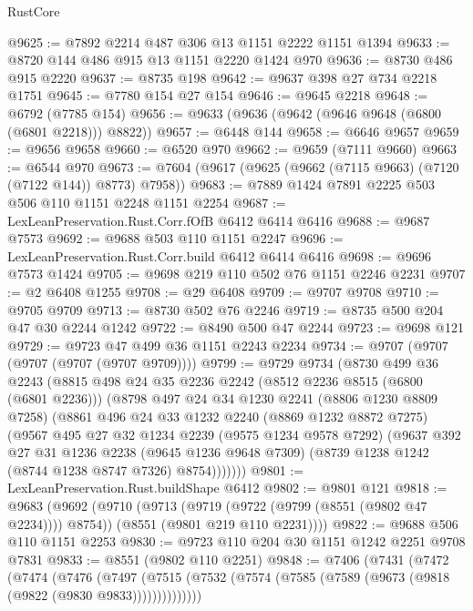 \begin{lexlean}{RustCore}
\begin{coremodule}
@9625 := @7892 @2214 @487 @306 @13 @1151 @2222 @1151 @1394
@9633 := @8720 @144 @486 @915 @13 @1151 @2220 @1424 @970
@9636 := @8730 @486 @915 @2220
@9637 := @8735 @198
@9642 := @9637 @398 @27 @734 @2218 @1751
@9645 := @7780 @154 @27 @154
@9646 := @9645 @2218
@9648 := @6792 (@7785 @154)
@9656 := @9633 (@9636 (@9642 (@9646 @9648 (@6800 (@6801 @2218))) @8822))
@9657 := @6448 @144
@9658 := @6646 @9657
@9659 := @9656 @9658
@9660 := @6520 @970
@9662 := @9659 (@7111 @9660)
@9663 := @6544 @970
@9673 := @7604 (@9617 (@9625 (@9662 (@7115 @9663) (@7120 (@7122 @144)) @8773) @7958))
@9683 := @7889 @1424 @7891 @2225 @503 @506 @110 @1151 @2248 @1151 @2254
@9687 := LexLeanPreservation.Rust.Corr.fOfB @6412 @6414 @6416
@9688 := @9687 @7573
@9692 := @9688 @503 @110 @1151 @2247
@9696 := LexLeanPreservation.Rust.Corr.build @6412 @6414 @6416
@9698 := @9696 @7573 @1424
@9705 := @9698 @219 @110 @502 @76 @1151 @2246 @2231
@9707 := @2 @6408 @1255
@9708 := @29 @6408
@9709 := @9707 @9708
@9710 := @9705 @9709
@9713 := @8730 @502 @76 @2246
@9719 := @8735 @500 @204 @47 @30 @2244 @1242
@9722 := @8490 @500 @47 @2244
@9723 := @9698 @121
@9729 := @9723 @47 @499 @36 @1151 @2243 @2234
@9734 := @9707 (@9707 (@9707 (@9707 (@9707 @9709))))
@9799 := @9729
    @9734
    (@8730
      @499
      @36
      @2243
      (@8815
        @498
        @24
        @35
        @2236
        @2242
        (@8512 @2236 @8515 (@6800 (@6801 @2236)))
        (@8798
          @497
          @24
          @34
          @1230
          @2241
          (@8806 @1230 @8809 @7258)
          (@8861
            @496
            @24
            @33
            @1232
            @2240
            (@8869 @1232 @8872 @7275)
            (@9567
              @495
              @27
              @32
              @1234
              @2239
              (@9575 @1234 @9578 @7292)
              (@9637
                @392
                @27
                @31
                @1236
                @2238
                (@9645 @1236 @9648 @7309)
                (@8739 @1238 @1242 (@8744 @1238 @8747 @7326) @8754)))))))
@9801 := LexLeanPreservation.Rust.buildShape @6412
@9802 := @9801 @121
@9818 := @9683
    (@9692
      (@9710
        (@9713 (@9719 (@9722 (@9799 (@8551 (@9802 @47 @2234)))) @8754))
        (@8551 (@9801 @219 @110 @2231))))
@9822 := @9688 @506 @110 @1151 @2253
@9830 := @9723 @110 @204 @30 @1151 @1242 @2251 @9708 @7831
@9833 := @8551 (@9802 @110 @2251)
@9848 := @7406
    (@7431
      (@7472
        (@7474
          (@7476
            (@7497
              (@7515 (@7532 (@7574 (@7585 (@7589 (@9673 (@9818 (@9822 (@9830 @9833))))))))))))))

\end{coremodule}
\end{lexlean}
